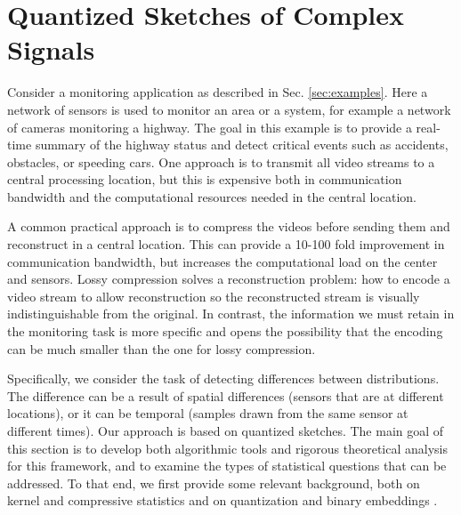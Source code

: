 \section{Quantized Sketches of Complex Signals}
\label{sec:QuantSketch}

Consider a monitoring application as described
in Sec. \ref{sec:examples}.  Here a network of sensors is used to
monitor an area or a system, for example a network of
cameras monitoring a highway. The goal in this example is to provide a real-time summary of the highway status
and detect critical events such as accidents, obstacles, or speeding cars. One approach is to transmit
all video streams to a central processing location, but this is expensive both in  communication
bandwidth and the computational resources needed in the central
location.

A common practical approach is to compress the videos before sending
them and reconstruct in a central location. This 
can provide a 10-100 fold improvement in communication
bandwidth, but increases the computational load on the center and sensors.
Lossy compression solves a reconstruction problem: how to encode a
video stream to allow reconstruction
so the reconstructed stream is visually indistinguishable from the
original. In contrast, the information we must retain in the
monitoring task is more specific and opens the possibility that
the encoding can be much smaller than the one  for lossy
compression.

Specifically, we consider the task of detecting  differences between distributions. The difference can be a result of spatial
differences (sensors that are at different locations), or it can be
temporal (samples drawn from the same sensor at different times).
Our approach is based on quantized sketches.
 The main goal of this section is to develop both algorithmic tools and rigorous theoretical analysis for this framework, and to examine the types of statistical questions that can be addressed. 
To that
end, we first provide some relevant background, both on kernel
and compressive statistics
\cite{gretton2012kernel,gribonval2017compressive,cheng2017two}
and on quantization and binary embeddings \cite{jacques2013robust,SaabIEEEIT,saab2018quantization,huynh2018fast}.  
 
